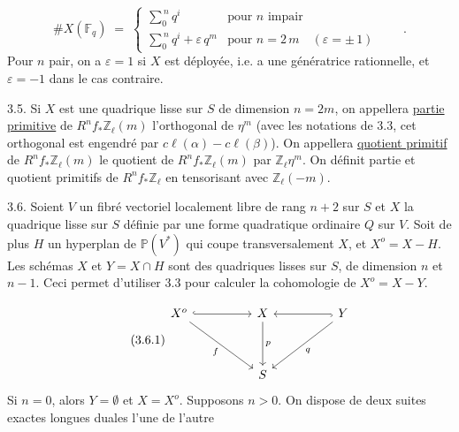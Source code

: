 \begin{equation*}
\# X(\mathbb{F}_q) \;=\; \left\{ \begin{array}{ll} \displaystyle\sum_{0}^{\,n} q^{i} & \mbox{pour } n \mbox{ impair} \\[3ex] \displaystyle\sum_{0}^{\,n} q^{i} + \varepsilon\, q^{m} & \mbox{pour } n = 2\,m \quad (\varepsilon = \pm\, 1) \end{array} \right. \qquad .
\end{equation*}
Pour $n$ pair, on a $\varepsilon = 1$ si $X$ est déployée, i.e. \quad a une génératrice rationnelle, et $\varepsilon = -1$ dans le cas contraire.

3.5. Si $X$ est une quadrique lisse sur $S$ de dimension $n = 2m$, on appellera \underline{partie primitive} de $R^{n}f_{*}\mathbb{Z}_{\ell}(m)$ l'orthogonal de $\eta^{m}$ (avec les notations de 3.3, cet orthogonal est engendré par $c\ell(\alpha)-c\ell(\beta)$). On appellera \underline{quotient primitif} de $R^{n}f_{*}\mathbb{Z}_{\ell}(m)$ le quotient de $R^{n}f_{*}\mathbb{Z}_{\ell}(m)$ par $\mathbb{Z}_{\ell}\eta^{m}$. On définit partie et quotient primitifs de $R^{n}f_{*}\mathbb{Z}_{\ell}$ en tensorisant avec $\mathbb{Z}_{\ell}(-m)$.

3.6. Soient $V$ un fibré vectoriel localement libre de rang $n + 2$ sur $S$ et $X$ la quadrique lisse sur $S$ définie par une forme quadratique ordinaire $Q$ sur $V$. Soit de plus $H$ un hyperplan de $\mathbb{P}(V^{*})$ qui coupe transversalement $X$, et $X^{o} = X - H$. Les schémas $X$ et $Y = X \cap H$ sont des quadriques lisses sur $S$, de dimension $n$ et $n - 1$. Ceci permet d'utiliser 3.3 pour calculer la cohomologie de $X^{o} = X - Y$.



\begin{equation}\tag{3.6.1}
\begin{tikzcd}[column sep=huge, row sep=huge]
X^{o} \arrow[r, hook] \arrow[rd, "f"'] & X \arrow[d, "p"] & Y \arrow[l, hook] \arrow[ld, "q"] \\
 {} & S &
{} \end{tikzcd}
\end{equation}
Si $n = 0$, alors $Y = \emptyset$ et $X = X^{o}$. Supposons $n > 0$. On dispose de deux suites exactes longues duales l'une de l'autre

